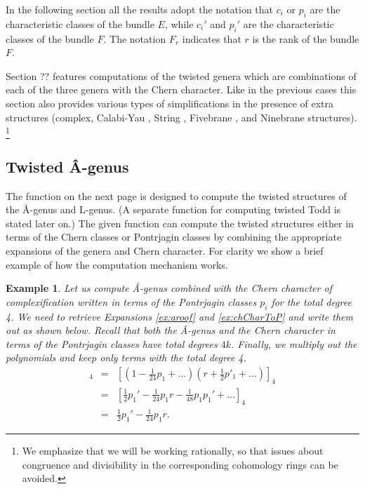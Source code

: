 \documentclass{amsart}
\theoremstyle{plain}
\newcommand{\ch}{\mathrm{ch}}
\newtheorem{example}{Example}
\numberwithin{equation}{section}
\begin{document}
\medskip
In the following section all the results adopt the notation that $c_i$ or $p_i$ are the 
characteristic classes of the bundle $ E $, while $c_i'$ and $p_i'$ are the characteristic 
classes of the bundle $ F $. The notation $F_r$ indicates that $r$ is the rank of the bundle $ F $.

\medskip
Section ?? features computations of the twisted genera which are combinations of each of the three genera with the Chern character. Like in the previous cases this section also provides various types of simplifications in the presence of extra structures (complex, Calabi-Yau \cite{Gross-Huybrechts}, String \cite{AHS}, Fivebrane \cite{SSS2}\cite{SSS3}, and Ninebrane \cite{Sati} structures).
\footnote{We emphasize that we will be working rationally, so that issues about 
congruence and divisibility in the corresponding cohomology rings can be avoided.}




\subsection{\bf Twisted \^{A}-genus}

The function on the next page is designed to compute the twisted structures of the \^{A}-genus 
and L-genus. (A separate function for computing twisted Todd is stated later on.) The given function 
can compute the twisted structures either in terms of the Chern classes or Pontrjagin classes by 
combining the appropriate expansions of the genera and Chern character. For clarity we show 
a brief example of how the computation mechanism works.



\begin{example}
Let us compute \^{A}-genus combined with the Chern character of complexification written in terms of the Pontrjagin classes $p_i$ for the total degree 4. We need to retrieve \textit{Expansions \ref{ex:aroof}} and \textit{\ref{ex:chCharToP}} and write them out as shown below. Recall that both the \^{A}-genus and the Chern character in terms of the Pontrjagin classes have total degrees $ 4k $. Finally, we multiply out the polynomials and keep only terms with the total degree 4.
\begin{eqnarray*}
[\hat{A}\cdot \ch(E_\mathbb{C})]_4 &=& [(1-\tfrac{1}{24}p_1+...)(r+\tfrac{1}{2}p'_1+...)]_4\\
&=& [\tfrac{1}{2}p_1' - \tfrac{1}{24}p_1r - \tfrac{1}{48}p_1p_1' +...]_4 \\
&=& \tfrac{1}{2}p_1' - \tfrac{1}{24}p_1r.
\end{eqnarray*}
\end{example}
\end{document}
